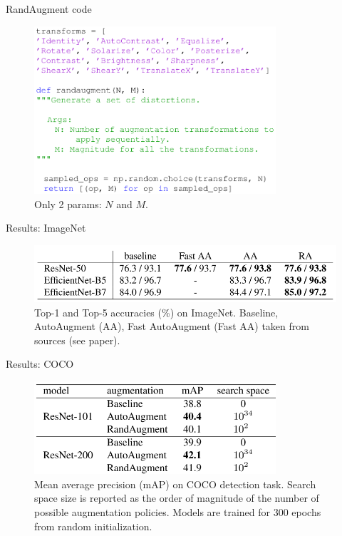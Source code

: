 \documentclass{beamer}
\begin{document}
\begin{frame}{RandAugment code}

\begin{figure}[h]
\includegraphics[width=0.8\textwidth]{img/code}
\caption{Only 2 params: $N$ and $M$.}
\end{figure}

\end{frame}
\begin{frame}{Results: ImageNet}
\begin{figure}[h]
\includegraphics[width=\textwidth]{img/imagenet}
\caption{Top-1 and Top-5 accuracies (\%) on ImageNet. Baseline,  AutoAugment (AA), Fast AutoAugment (Fast AA) taken from sources (see paper).}
\end{figure}
\end{frame}
\begin{frame}{Results: COCO}
\begin{figure}[h]
\includegraphics[width=0.8\textwidth]{img/coco}
\caption{Mean average precision (mAP) on COCO detection task. Search space size is reported as the order of magnitude of the number of possible augmentation policies. Models are trained for 300 epochs from random initialization.}
\end{figure}
\end{frame}
\end{document}
